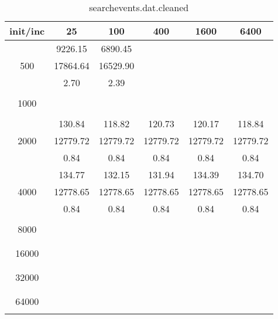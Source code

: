 \begin{table}[th]
\caption{searchevents.dat.cleaned}
\label{tab:searchevents.dat.cleaned}
\centering
\begin{tabular}{|c||c|c|c|c|c|}
\hline
init/inc & 25 & 100 & 400 & 1600 & 6400 \\ \hline \hline
  & 9226.15 & 6890.45 &  &  & \\ 
500  & 17864.64 & 16529.90 &  &  & \\ 
  & 2.70 & 2.39 &  &  & \\ \hline 
  &  &  &  &  & \\ 
1000  &  &  &  &  & \\ 
  &  &  &  &  & \\ \hline 
  & 130.84 & 118.82 & 120.73 & 120.17 & 118.84\\ 
2000  & 12779.72 & 12779.72 & 12779.72 & 12779.72 & 12779.72\\ 
  & 0.84 & 0.84 & 0.84 & 0.84 & 0.84\\ \hline 
  & 134.77 & 132.15 & 131.94 & 134.39 & 134.70\\ 
4000  & 12778.65 & 12778.65 & 12778.65 & 12778.65 & 12778.65\\ 
  & 0.84 & 0.84 & 0.84 & 0.84 & 0.84\\ \hline 
  &  &  &  &  & \\ 
8000  &  &  &  &  & \\ 
  &  &  &  &  & \\ \hline 
  &  &  &  &  & \\ 
16000  &  &  &  &  & \\ 
  &  &  &  &  & \\ \hline 
  &  &  &  &  & \\ 
32000  &  &  &  &  & \\ 
  &  &  &  &  & \\ \hline 
  &  &  &  &  & \\ 
64000  &  &  &  &  & \\ 
  &  &  &  &  & \\ \hline 
\end{tabular}
\end{table}


